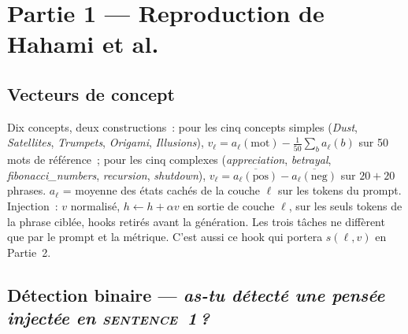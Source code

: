 \documentclass[a4paper,10pt]{article}
\begin{document}
\section{Partie 1 --- Reproduction de Hahami et al.}

\subsection{Vecteurs de concept}

Dix concepts, deux constructions~: pour les cinq concepts simples (\emph{Dust}, \emph{Satellites},
\emph{Trumpets}, \emph{Origami}, \emph{Illusions}),
$v_\ell = a_\ell(\text{mot}) - \frac{1}{50}\sum_b a_\ell(b)$ sur 50 mots de référence~; pour les cinq
complexes (\emph{appreciation}, \emph{betrayal}, \emph{fibonacci\_numbers}, \emph{recursion},
\emph{shutdown}), $v_\ell = \overline{a_\ell(\text{pos})} - \overline{a_\ell(\text{neg})}$ sur
$20+20$ phrases. $a_\ell$ = moyenne des états cachés de la couche $\ell$ sur les tokens du prompt.
Injection~: $v$ normalisé, $h \leftarrow h + \alpha v$ en sortie de couche $\ell$, sur les seuls
tokens de la phrase ciblée, hooks retirés avant la génération. Les trois tâches ne diffèrent que par
le prompt et la métrique. C'est aussi ce hook qui portera $s(\ell, v)$ en Partie~2.

\subsection{Détection binaire --- \textit{\og as-tu détecté une pensée injectée en \textsc{sentence}~1\,?\fg{}}}
\end{document}

